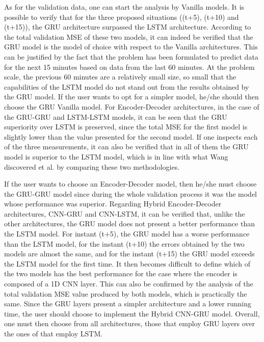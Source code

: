 As for the validation data, one can start the analysis by Vanilla models. It is possible to verify that for the three proposed situations ((t+5), (t+10) and (t+15)), the \ac{GRU} architecture surpassed the \ac{LSTM} architecture. According to the total validation \ac{MSE} of these two models, it can indeed be verified that the \ac{GRU} model is the model of choice with respect to the Vanilla architectures. This can be justified by the fact that the problem has been formulated to predict data for the next 15 minutes based on data from the last 60 minutes. At the problem scale, the previous 60 minutes are a relatively small size, so small that the capabilities of the \ac{LSTM} model do not stand out from the results obtained by the \ac{GRU} model. If the user wants to opt for a simpler model, he/she should then choose the \ac{GRU} Vanilla model. For Encoder-Decoder architectures, in the case of the \ac{GRU}-\ac{GRU} and \ac{LSTM}-\ac{LSTM} models, it can be seen that the \ac{GRU} superiority over \ac{LSTM} is preserved, since the total \ac{MSE} for the first model is slightly lower than the value presented for the second model. If one inspects each of the three measurements, it can also be verified that in all of them the \ac{GRU} model is superior to the \ac{LSTM} model, which is in line with what Wang discovered et al. \cite{annr26} by comparing these two methodologies.




If the user wants to choose an Encoder-Decoder model, then he/she must choose the \ac{GRU}-\ac{GRU}  model since during the whole validation process it was the model whose performance was superior. Regarding Hybrid Encoder-Decoder architectures, \acs{CNN}-\ac{GRU} and \acs{CNN}-\ac{LSTM}, it can be verified that, unlike the other architectures, the \ac{GRU} model does not present a better performance than the \ac{LSTM} model. For instant (t+5), the GRU model has a worse performance than the \ac{LSTM} model, for the instant (t+10) the errors obtained by the two models are almost the same, and for the instant (t+15) the \ac{GRU} model exceeds the \ac{LSTM} model for the first time. It then becomes difficult to define which of the two models has the best performance for the case where the encoder is composed of a \ac{1D CNN} layer. This can also be confirmed by the analysis of the total validation \ac{MSE} value produced by both models, which is practically the same. Since the \ac{GRU} layers present a simpler architecture and a lower running time, the user should choose to implement the Hybrid \ac{CNN}-\ac{GRU} model. Overall, one must then choose from all architectures, those that employ \ac{GRU} layers over the ones of that employ \ac{LSTM}.

